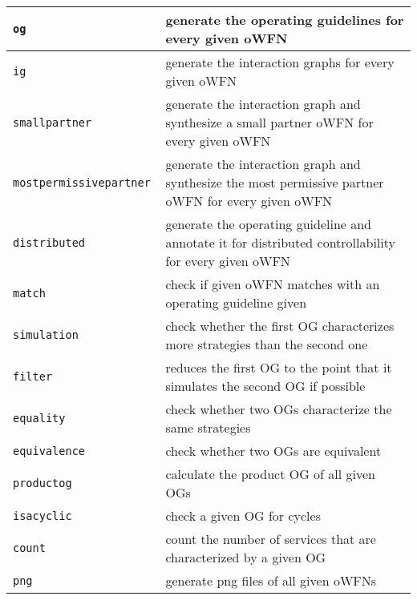 \sf
\begin{longtable}{lp{200pt}}
\hline
\texttt{og  }& generate the operating guidelines for every given oWFN \\
\hline
\texttt{ig  }& generate the interaction graphs for every given oWFN \\
\hline
\texttt{smallpartner }& generate the interaction graph and synthesize a small partner oWFN for every given oWFN \\
\hline
\texttt{mostpermissivepartner   }& generate the interaction graph and synthesize the most permissive partner oWFN for every given oWFN \\
\hline
\texttt{distributed }& generate the operating guideline and annotate it for distributed controllability for every given oWFN \\
\hline
\texttt{match   }& check if given oWFN matches with an operating guideline given \\
\hline
\texttt{simulation }& check whether the first OG characterizes more strategies than the second one \\
\hline
\texttt{filter }& reduces the first OG to the point that it simulates the second OG if possible \\
\hline
\texttt{equality }& check whether two OGs characterize the same strategies \\
\hline
\texttt{equivalence }& check whether two OGs are equivalent \\
\hline
\texttt{productog }& calculate the product OG of all given OGs \\
\hline
\texttt{isacyclic }& check a given OG for cycles \\
\hline
\texttt{count }& count the number of services that are characterized by a given OG \\
\hline
\texttt{png }& generate png files of all given oWFNs \\
\hline
\end{longtable}
\rm
